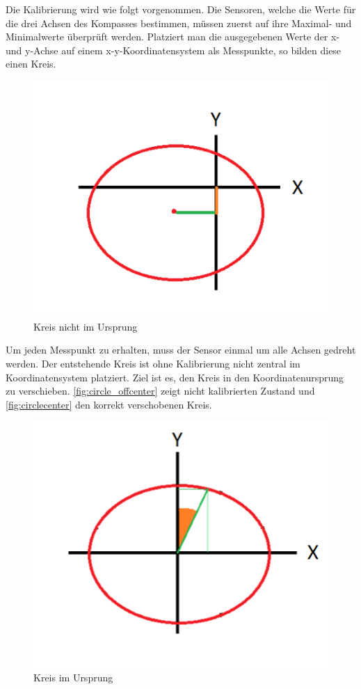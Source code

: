 Die Kalibrierung wird wie folgt vorgenommen.
Die Sensoren, welche die Werte für die drei Achsen des Kompasses bestimmen, müssen zuerst auf ihre Maximal- und Minimalwerte überprüft werden.
Platziert man die ausgegebenen Werte der x- und y-Achse auf einem x-y-Koordinatensystem als Messpunkte, so bilden diese einen Kreis.
\begin{figure}[htpb] %
    \centering
    \includegraphics[scale=0.7,keepaspectratio=true]{pics/circle_offcenter.png}
    \caption{Kreis nicht im Ursprung}
    \label{fig:circle_offcenter}
\end{figure}
Um jeden Messpunkt zu erhalten, muss der Sensor einmal um alle Achsen gedreht werden.
Der entstehende Kreis ist ohne Kalibrierung nicht zentral im Koordinatensystem platziert.
Ziel ist es, den Kreis in den Koordinatenursprung zu verschieben.
\autoref{fig:circle_offcenter} zeigt nicht kalibrierten Zustand und \autoref{fig:circlecenter} den korrekt verschobenen Kreis.
\begin{figure}[htpb] %
    \centering
    \includegraphics[scale=0.7,keepaspectratio=true]{pics/circle_center.png}
    \caption{Kreis im Ursprung}
    \label{fig:circlecenter}
\end{figure}

